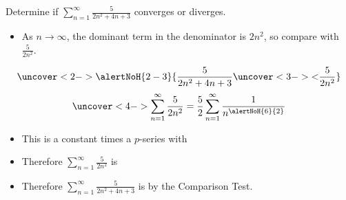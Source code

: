 \begin{frame}
\begin{example}[Example 1, p. 742]
Determine if $\sum_{n=1}^\infty \frac{5}{2n^2+4n+3}$ converges or diverges.
\begin{itemize}
\item<2->  As $n\to \infty$, the dominant term in the denominator is $2n^2$, so compare with $\frac{5}{2n^2}$.
\end{itemize}
\abovedisplayskip=0pt
\belowdisplayskip=0pt
\[
\uncover<2->{%
\alertNoH{ 2-3}{%
\frac{5}{2n^2+4n+3} \uncover<3->{<} \frac{5}{2n^2}%
}}%
\]
\abovedisplayskip=0pt
\belowdisplayskip=0pt
\[
\uncover<4->{%
\sum_{n=1}^\infty \frac{5}{2n^2} = \frac{5}{2}\sum_{n=1}^\infty \frac{1}{n^{\alertNoH{ 6}{2}}}%
}%
\]
\begin{itemize}
\item<5->  This is a constant times a $p$-series with 
\item<7-| alert@7-8>  Therefore $\sum_{n=1}^\infty \frac{5}{2n^2}$ is 
\item<9-| alert@9-10>  Therefore $\sum_{n=1}^\infty \frac{5}{2n^2+4n+3}$ is  by the Comparison Test.
\end{itemize}
\end{example}
\end{frame}
